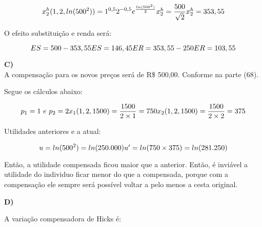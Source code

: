 \documentclass[a4paper, 12pt]{article} %
\begin{document}
\begin{flushleft}
\begin{equation}
x_{2}^{h}(1,2,ln(500^{2})) = 1^{0,5}2^{-0,5}e^{{\frac{ln(500^{2})}{2}}}
$$\\$$
x_{2}^{h} = \dfrac{500}{\sqrt{2}}
$$\\$$
x_{2}^{h} = 353,55
\end{equation}

\begin{center}
O efeito substituição e renda será:
\end{center}
\begin{equation}
ES = 500 - 353,55
$$\\$$
ES = 146,45
$$\\$$
ER = 353,55 - 250
$$\\$$
ER = 103,55
\end{equation}

\singlespacing

\textbf{C)}
\\
A compensação para os novos preços será de R\$ 500,00. Conforme na parte (68).

\begin{center}
Segue os cálculos abaixo:
\end{center}

\begin{equation}
p_{1} = 1 \ e \ p_{2} = 2
$$\\$$
x_{1}(1,2,1500) = \dfrac{1500}{2 \times 1} = 750
$$\\$$
x_{2}(1,2,1500) = \dfrac{1500}{2 \times 2 } = 375
\end{equation}

\begin{center}
Utilidades anteriores e a atual:
\end{center}

\begin{equation}
u = ln(500^{2}) = ln(250.000)
$$\\$$
u' = ln(750 \times 375) = ln(281.250)
\end{equation}

Então, a utilidade compensada ficou maior que a anterior. Então, é inviável a utilidade do individuo ficar menor do que a compensada, porque com a compensação ele sempre será possível voltar a pelo menos a cesta original.

\singlespacing

\textbf{D)}
\\
 
 \begin{center}
  A variação compensadora de Hicks é:
 \end{center}


\end{flushleft}
\end{document}

